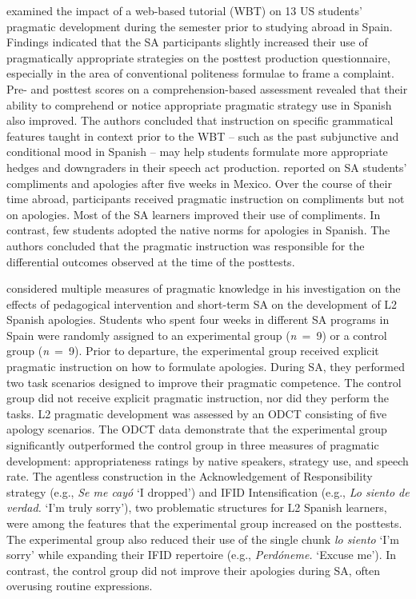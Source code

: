 \documentclass[output=paper]{langscibook}
\begin{document}
  \citet{RussellVásquez2018} examined the impact of a web-based tutorial (WBT) on 13 US students’ pragmatic development during the semester prior to studying abroad in Spain. Findings indicated that the SA participants slightly increased their use of pragmatically appropriate strategies on the posttest production questionnaire, especially in the area of conventional politeness formulae to frame a complaint. Pre- and posttest scores on a comprehension-based assessment revealed that their ability to comprehend or notice appropriate pragmatic strategy use in Spanish also improved. The authors concluded that instruction on specific grammatical features taught in context prior to the WBT -- such as the past subjunctive and conditional mood in Spanish -- may help students formulate more appropriate hedges and downgraders in their speech act production. \citet{DiBartolomeoJung2019} reported on SA students’ compliments and apologies after five weeks in Mexico. Over the course of their time abroad, participants received pragmatic instruction on compliments but not on apologies. Most of the SA learners improved their use of compliments. In contrast, few students adopted the native norms for apologies in Spanish. The authors concluded that the pragmatic instruction was responsible for the differential outcomes observed at the time of the posttests.

\citet{Hernándezinpress} considered multiple measures of pragmatic knowledge in his investigation on the effects of pedagogical intervention and short-term SA on the development of L2 Spanish apologies. Students who spent four weeks in different SA programs in Spain were randomly assigned to an experimental group (\textit{n}~=~9) or a control group (\textit{n}~=~9). Prior to departure, the experimental group received explicit pragmatic instruction on how to formulate apologies. During SA, they performed two task scenarios designed to improve their pragmatic competence. The control group did not receive explicit pragmatic instruction, nor did they perform the tasks. L2 pragmatic development was assessed by an ODCT consisting of five apology scenarios. The ODCT data demonstrate that the experimental group significantly outperformed the control group in three measures of pragmatic development: appropriateness ratings by native speakers, strategy use, and speech rate. The agentless construction in the Acknowledgement of Responsibility strategy (e.g., \textit{Se me cayó} `I dropped') and IFID Intensification (e.g., \textit{Lo siento de verdad.} ‘I’m truly sorry’), two problematic structures for L2 Spanish learners, were among the features that the experimental group increased on the posttests. The experimental group also reduced their use of the single chunk \textit{lo siento} `I’m sorry' while expanding their IFID repertoire (e.g., \textit{Perdóneme.} ‘Excuse me’). In contrast, the control group did not improve their apologies during SA, often overusing routine expressions.
\end{document}
